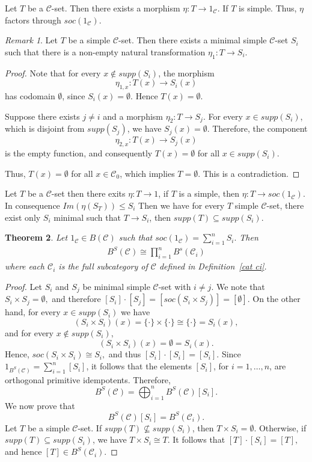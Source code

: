 \documentclass[a4paper]{article}
\newtheorem{thm}{Theorem}[section]
\theoremstyle{definition}
\theoremstyle{remark}
\newtheorem{rem}[thm]{Remark}
\newcommand*{\cat}[1]{\mathcal{#1}}
\begin{document}
Let $T$ be a $\cat{C}$-set. Then there exists a morphism $\eta \colon T \to 1_{\cat{C}}$. If $T$ is simple. Thus, $\eta$ factors through $soc(1_{\cat{C}})$.
 \begin{rem}
Let $T$ be a simple $\cat{C}$-set. Then there exists a minimal simple $\cat{C}$-set $S_i$ such that there is a non-empty natural transformation $\eta_1:T\longrightarrow S_i.$
 \end{rem}
 \begin{proof}
Note that for every $x \notin supp(S_i)$, the morphism
\[
\eta_{1,x} : T(x) \to S_i(x)
\]
has codomain $\emptyset$, since $S_i(x)=\emptyset$. Hence $T(x)=\emptyset$.

Suppose there exists $j \neq i$ and a morphism $\eta_2 : T \to S_j$.
For every $x \in supp(S_i)$, which is disjoint from $supp(S_j)$, we have
$S_j(x)=\emptyset$. Therefore, the component
\[
\eta_{2,x} : T(x) \to S_j(x)
\]
is the empty function, and consequently $T(x)=\emptyset$ for all
$x \in supp(S_i)$.

Thus, $T(x)=\emptyset$ for all $x \in \cat{C}_0$, which implies $T=\emptyset$.
This is a contradiction.
\end{proof}
Let $T$ be a $\cat{C}$-set then there exits $\eta : T\to 1$, if $T$ is a simple,   then  $\eta : T\to soc(1_\cat{C})$. In consequence $Im(\eta (S_T))\leq S_i$
Then we have for every $T$ simple $\cat{C}$-set, there exist only $S_i$  minimal such that $T\to S_i$, then $supp(T)\subseteq supp(S_i)$.

 \begin{thm}\label{descom de B^S}
 Let $1_\cat{C}\in B(\cat{C})$ such that $soc(1_\cat{C}) = \sum_{i=1}^n S_i.$  Then 
 \begin{align*}
 B^S(\cat{C})\cong\prod_{i=1}^n B^s({\cat{C}_i})
 \end{align*}
 where each $\cat{C}_i$ is the full subcategory of $\cat{C}$ defined in Definition~\ref{cat ci}.
 \end{thm}
\begin{proof}
    Let $S_i$ and $S_j$ be minimal  simple $\cat{C}$-set with $i \neq j$. We note that $ S_i \times S_j = \emptyset,$
and therefore $ [S_i]\cdot [S_j] = [soc(S_i \times S_j)] =[\emptyset].
$ 
On the other hand, for every $x \in supp(S_i)$ we have
\[
(S_i \times S_i)(x)
= \{\cdot\} \times \{\cdot\}
\cong \{\cdot\}
= S_i(x),
\]
and for every $x \notin supp(S_i)$,
\[
(S_i \times S_i)(x) = \emptyset = S_i(x).
\]
Hence, $soc(S_i \times S_i) \cong S_i,$ 
and thus $[S_i]\cdot [S_i] = [S_i].$
Since $ 1_{B^S(\cat{C})}=\sum_{i=1}^n [S_i]$, it follows that the elements
$[S_i]$, for $i=1,\dots,n$, are orthogonal primitive idempotents. Therefore,
\[
B^S(\cat{C}) = \bigoplus_{i=1}^n B^S(\cat{C})[S_i].
\]
We now prove that
\[
B^S(\cat{C})[S_i] = B^S(\cat{C}_i).
\]
Let $T$ be a simple $\cat{C}$-set. If $supp(T) \nsubseteq supp(S_i)$, then $T \times S_i = \emptyset.$
Otherwise, if $supp(T) \subseteq supp(S_i)$, we have $T \times S_i \cong T.$ It follows that $[T]\cdot [S_i] = [T],$
and hence $[T] \in B^S(\cat{C}_i)$.

\end{proof}
\end{document}
